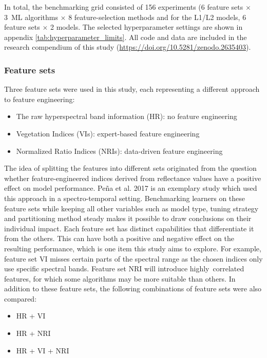 \documentclass[remotesensing,article,submit,moreauthors,pdftex]{Definitions/mdpi}
\begin{document}
In total, the benchmarking grid consisted of 156 experiments (6 feature sets $\times$ 3~ML algorithms $\times$ 8 feature-selection methods and for the L1/L2 models, 6 feature sets $\times$ 2 models.
The selected hyperparameter settings are shown in appendix \autoref{tab:hyperparameter_limits}.
All code and data are included in the research compendium of this study (\url{https://doi.org/10.5281/zenodo.2635403}).

\subsubsection{Feature sets}

Three feature sets were used in this study, each representing a different approach to feature engineering:

\begin{itemize}
	\item The raw hyperspectral band information (HR): no feature engineering %
	\item Vegetation Indices (\ac{VI}s): expert-based feature engineering
	\item Normalized Ratio Indices (\ac{NRI}s): data-driven feature engineering
\end{itemize}

The idea of splitting the features into different sets originated from the question whether feature-engineered indices derived from reflectance values have a positive effect on model performance.
Peña et al. 2017 \cite{pena2017} is an exemplary study which used this approach in a spectro-temporal setting.
Benchmarking learners on these feature sets while keeping all other variables such as model type, tuning strategy and partitioning method steady makes it possible to draw conclusions on their individual impact.
Each feature set has distinct capabilities that differentiate it from the others.
This can have both a positive and negative effect on the resulting performance, which is one item this study aims to explore.
For example, feature set VI misses certain parts of the spectral range as the chosen indices only use specific spectral bands.
Feature set NRI will introduce highly\ correlated features, for which some algorithms may be more suitable than others.
In addition to these feature sets, the following combinations of feature sets were also compared:

\begin{itemize}
	\item HR + VI %
	\item HR + NRI
	\item HR + VI + NRI
\end{itemize}
\end{document}

